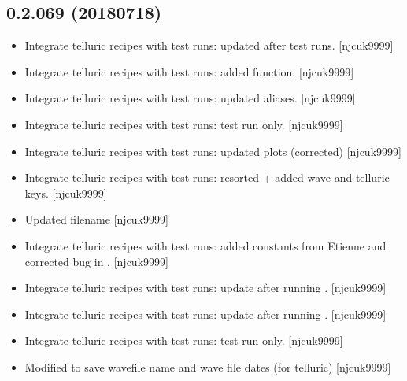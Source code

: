 \documentclass[a4paper,10pt,english]{report}
\begin{document}
\subsection{0.2.069 (2018\sphinxhyphen{}07\sphinxhyphen{}18)}
\label{\detokenize{misc/changelog:id408}}\begin{itemize}
\item {} 
Integrate telluric recipes with test runs: updated after test runs.
{[}njcuk9999{]}

\item {} 
Integrate telluric recipes with test runs: added 
function. {[}njcuk9999{]}

\item {} 
Integrate telluric recipes with test runs: updated aliases.
{[}njcuk9999{]}

\item {} 
Integrate telluric recipes with test runs: test run only. {[}njcuk9999{]}

\item {} 
Integrate telluric recipes with test runs: updated plots (corrected)
{[}njcuk9999{]}

\item {} 
Integrate telluric recipes with test runs: resorted  + added
wave and telluric keys. {[}njcuk9999{]}

\item {} 
Updated filename  {[}njcuk9999{]}

\item {} 
Integrate telluric recipes with test runs: added constants from
Etienne and corrected bug in . {[}njcuk9999{]}

\item {} 
Integrate telluric recipes with test runs: update after running
. {[}njcuk9999{]}

\item {} 
Integrate telluric recipes with test runs: update after running
. {[}njcuk9999{]}

\item {} 
Integrate telluric recipes with test runs: test run only. {[}njcuk9999{]}

\item {} 
Modified  to save wavefile name and wave file dates (for
telluric) {[}njcuk9999{]}

\end{itemize}
\end{document}
